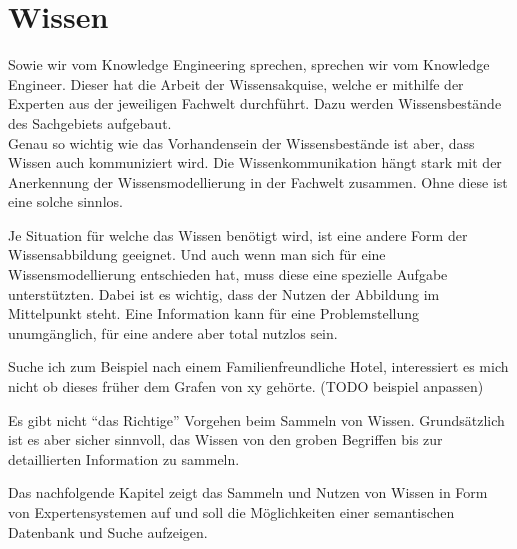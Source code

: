 \section{Wissen}
\label{chap:einleitung_wissen}


Sowie wir vom Knowledge Engineering sprechen, sprechen wir vom Knowledge Engineer. Dieser hat die Arbeit der Wissensakquise, welche er mithilfe der Experten aus der jeweiligen Fachwelt durchführt. Dazu werden Wissensbestände des Sachgebiets aufgebaut. \\
Genau so wichtig wie das Vorhandensein der Wissensbestände ist aber, dass Wissen auch kommuniziert wird. Die Wissenkommunikation hängt stark mit der Anerkennung der Wissensmodellierung in der Fachwelt zusammen. Ohne diese ist eine solche sinnlos.
 
Je Situation für welche das Wissen benötigt wird, ist eine andere Form der Wissensabbildung geeignet. Und auch wenn man sich für eine Wissensmodellierung entschieden hat, muss diese eine spezielle Aufgabe unterstützten. Dabei ist es wichtig, dass der Nutzen der Abbildung im Mittelpunkt steht. Eine Information kann für eine Problemstellung unumgänglich, für eine andere aber total nutzlos sein.

\noindent\hspace*{15mm}Suche ich zum Beispiel nach einem Familienfreundliche Hotel, interessiert es mich nicht ob dieses früher dem Grafen von xy gehörte. (TODO beispiel anpassen)

Es gibt nicht ``das Richtige'' Vorgehen beim Sammeln von Wissen. Grundsätzlich ist es aber sicher sinnvoll, das Wissen von den groben Begriffen bis zur detaillierten Information zu sammeln.

Das nachfolgende Kapitel zeigt das Sammeln und Nutzen von Wissen in Form von Expertensystemen auf und soll die Möglichkeiten einer semantischen Datenbank und Suche aufzeigen.
